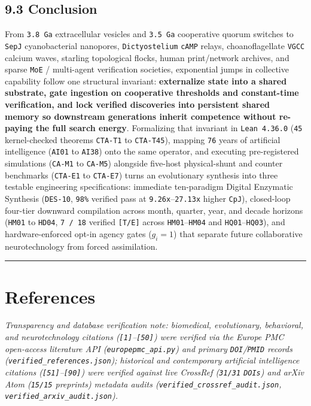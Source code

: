 \documentclass[10pt,letterpaper]{article}
\begin{document}
\subsection{9.3 Conclusion}\label{conclusion}

From \texttt{3.8\ Ga} extracellular vesicles and \texttt{3.5\ Ga}
cooperative quorum switches to \texttt{SepJ} cyanobacterial nanopores,
\texttt{Dictyostelium} \texttt{cAMP} relays, choanoflagellate
\texttt{VGCC} calcium waves, starling topological flocks, human
print/network archives, and sparse \texttt{MoE} / multi-agent
verification societies, exponential jumps in collective capability
follow one structural invariant: \textbf{externalize state into a shared
substrate, gate ingestion on cooperative thresholds and constant-time
verification, and lock verified discoveries into persistent shared
memory so downstream generations inherit competence without re-paying
the full search energy}. Formalizing that invariant in
\texttt{Lean\ 4.\allowbreak{}36.\allowbreak{}0} (\texttt{45} kernel-checked theorems
\texttt{CTA-T1} to \texttt{CTA-T45}), mapping \texttt{76} years of
artificial intelligence (\texttt{AI01} to \texttt{AI38}) onto the same
operator, and executing pre-registered simulations (\texttt{CA-M1} to
\texttt{CA-M5}) alongside five-host physical-shunt and counter
benchmarks (\texttt{CTA-E1} to \texttt{CTA-E7}) turns an evolutionary
synthesis into three testable engineering specifications: immediate
ten-paradigm Digital Enzymatic Synthesis (\texttt{DES-10}, \texttt{98\%}
verified pass at \texttt{9.26x}--\texttt{27.13x} higher \texttt{CpJ}),
closed-loop four-tier downward compilation across month, quarter, year,
and decade horizons (\texttt{HM01} to \texttt{HD04}, \texttt{7\ /\ 18}
verified \texttt{{[}T/E{]}} across \texttt{HM01}--\texttt{HM04} and
\texttt{HQ01}--\texttt{HQ03}), and hardware-enforced opt-in agency gates
(\(g_i = 1\)) that separate future collaborative neurotechnology from
forced assimilation.

\begin{center}\rule{0.5\linewidth}{0.5pt}\end{center}

\section{References}\label{references}

\emph{Transparency and database verification note: biomedical,
evolutionary, behavioral, and neurotechnology citations
(\texttt{{[}1{]}}--\texttt{{[}50{]}}) were verified via the Europe PMC
open-access literature API (\texttt{europepmc\_\allowbreak{}api.\allowbreak{}py}) and primary
\texttt{DOI}/\allowbreak{}\texttt{PMID} records (\texttt{verified\_\allowbreak{}references.\allowbreak{}json});
historical and contemporary artificial intelligence citations
(\texttt{{[}51{]}}--\texttt{{[}90{]}}) were verified against live
CrossRef (\texttt{31/31} \texttt{DOIs}) and arXiv Atom (\texttt{15/15}
preprints) metadata audits (\texttt{verified\_\allowbreak{}crossref\_\allowbreak{}audit.\allowbreak{}json},
\texttt{verified\_\allowbreak{}arxiv\_\allowbreak{}audit.\allowbreak{}json}).}
\end{document}
